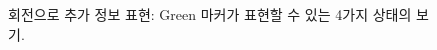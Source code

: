 \documentclass[chapter,11pt,oneside,openany]{xoblivoir}
\begin{document}
\begin{figure}[ht]
\begin{minipage}{0.17\textwidth}
\end{minipage}
\begin{minipage}{0.17\textwidth}
\end{minipage}
\begin{minipage}{0.17\textwidth}
\end{minipage}

\caption[회전으로 추가 정보 표현]{회전으로 추가 정보 표현: Green 마커가 표현할 수 있는 4가지 상태의 보기.}
\label{img:markerR}
\end{figure}
\end{document}

